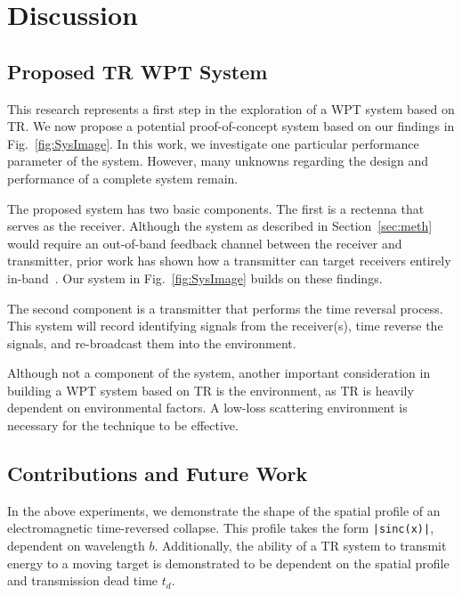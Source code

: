 \section{Discussion}
\label{sec:discussion}

\subsection{Proposed TR WPT System}
\label{sec:system}

This research represents a first step in the exploration of a WPT system based on TR. We now propose a potential proof-of-concept system based on our findings in Fig.~\ref{fig:SysImage}. In this work, we investigate one particular performance parameter of the system. However, many unknowns regarding the design and performance of a complete system remain.

The proposed system has two basic components. The first is a rectenna that serves as the receiver. Although the system as described in Section~\ref{sec:meth} would require an out-of-band feedback channel between the receiver and transmitter, prior work has shown how a transmitter can target  receivers entirely in-band~\cite{nltr-wave-chaotic,roman}. Our system in Fig.~\ref{fig:SysImage} builds on these findings.

The second component is a transmitter that performs the time reversal process. This system will record identifying signals from the receiver(s), time reverse the signals, and re-broadcast them into the environment.

Although not a component of the system, another important consideration in building a WPT system based on TR is the environment, as TR is heavily dependent on environmental factors. A low-loss scattering environment is necessary for the technique to be effective.

\subsection{Contributions and Future Work}
\label{sec:contrib}

In the above experiments, we demonstrate the shape of the spatial profile of an electromagnetic
time-reversed collapse. This profile takes the form \texttt{|sinc(x)|}, dependent on wavelength $b$.
Additionally, the ability of a TR system to transmit energy to a moving target is
demonstrated to be dependent on the spatial profile and transmission dead
time $t_{d}$.

